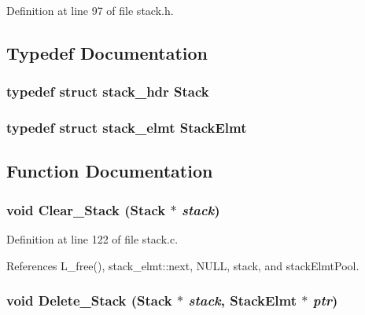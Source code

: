 Definition at line 97 of file stack.h.

\subsection{Typedef Documentation}
\subsubsection{\setlength{\rightskip}{0pt plus 5cm}typedef struct \bf{stack\_\-hdr}
 \bf{Stack}}\label{stack_8h_7cb63f025317f9d42014314930266f49}


\subsubsection{\setlength{\rightskip}{0pt plus 5cm}typedef struct \bf{stack\_\-elmt}
 \bf{Stack\-Elmt}}\label{stack_8h_5bb27a431245ed3a87a04c8e624d2ecf}




\subsection{Function Documentation}
\subsubsection{\setlength{\rightskip}{0pt plus 5cm}void Clear\_\-Stack (\bf{Stack} $\ast$ {\em stack})}\label{stack_8h_b45b82506f64b0e7ef9a027546a51711}




Definition at line 122 of file stack.c.

References L\_\-free(), stack\_\-elmt::next, NULL, stack, and stack\-Elmt\-Pool.
\subsubsection{\setlength{\rightskip}{0pt plus 5cm}void Delete\_\-Stack (\bf{Stack} $\ast$ {\em stack}, \bf{Stack\-Elmt} $\ast$ {\em ptr})}\label{stack_8h_e57980dc5bb79ef4228083a4cd1e1eee}




